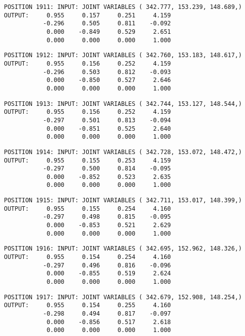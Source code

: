\begin{verbatim}
POSITION 1911: INPUT: JOINT VARIABLES ( 342.777, 153.239, 148.689,)
OUTPUT:     0.955     0.157     0.251     4.159
           -0.296     0.505     0.811    -0.092
            0.000    -0.849     0.529     2.651
            0.000     0.000     0.000     1.000
\end{verbatim} \pagebreak[1]\begin{verbatim}
POSITION 1912: INPUT: JOINT VARIABLES ( 342.760, 153.183, 148.617,)
OUTPUT:     0.955     0.156     0.252     4.159
           -0.296     0.503     0.812    -0.093
            0.000    -0.850     0.527     2.646
            0.000     0.000     0.000     1.000
\end{verbatim} \pagebreak[1]\begin{verbatim}
POSITION 1913: INPUT: JOINT VARIABLES ( 342.744, 153.127, 148.544,)
OUTPUT:     0.955     0.156     0.252     4.159
           -0.297     0.501     0.813    -0.094
            0.000    -0.851     0.525     2.640
            0.000     0.000     0.000     1.000
\end{verbatim} \pagebreak[1]\begin{verbatim}
POSITION 1914: INPUT: JOINT VARIABLES ( 342.728, 153.072, 148.472,)
OUTPUT:     0.955     0.155     0.253     4.159
           -0.297     0.500     0.814    -0.095
            0.000    -0.852     0.523     2.635
            0.000     0.000     0.000     1.000
\end{verbatim} \pagebreak[1]\begin{verbatim}
POSITION 1915: INPUT: JOINT VARIABLES ( 342.711, 153.017, 148.399,)
OUTPUT:     0.955     0.155     0.254     4.160
           -0.297     0.498     0.815    -0.095
            0.000    -0.853     0.521     2.629
            0.000     0.000     0.000     1.000
\end{verbatim} \pagebreak[1]\begin{verbatim}
POSITION 1916: INPUT: JOINT VARIABLES ( 342.695, 152.962, 148.326,)
OUTPUT:     0.955     0.154     0.254     4.160
           -0.297     0.496     0.816    -0.096
            0.000    -0.855     0.519     2.624
            0.000     0.000     0.000     1.000
\end{verbatim} \pagebreak[1]\begin{verbatim}
POSITION 1917: INPUT: JOINT VARIABLES ( 342.679, 152.908, 148.254,)
OUTPUT:     0.955     0.154     0.255     4.160
           -0.298     0.494     0.817    -0.097
            0.000    -0.856     0.517     2.618
            0.000     0.000     0.000     1.000
\end{verbatim} \pagebreak[1]\begin{verbatim}

\end{verbatim}
